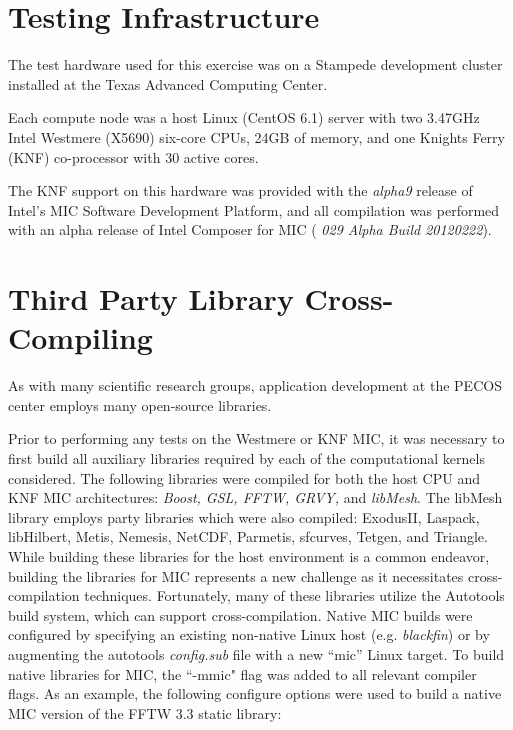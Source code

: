\section{Testing Infrastructure}
\label{sec:hardware}

The test hardware used for this exercise was
on a Stampede development cluster installed at the Texas Advanced
Computing Center.

Each compute node was a host Linux (CentOS 6.1)
server with two 3.47GHz Intel Westmere (X5690) six-core CPUs, 24GB of
memory, and one Knights Ferry (KNF) co-processor with 30 active
cores.

The KNF support on this hardware
was provided with the {\em alpha9} release of Intel's MIC Software
Development Platform, and all compilation was performed with an alpha
release of Intel Composer for MIC ({\em 
  029 Alpha Build 20120222}).

\section{Third Party Library Cross-Compiling} \label{sec:cross_compile}

As with many scientific research groups, application development at
the PECOS center employs many open-source libraries.

Prior to
performing any tests on the Westmere or KNF MIC, it was necessary to
first build all auxiliary libraries required by each of the
computational kernels considered.
The following libraries were
compiled for both the host CPU and KNF MIC architectures: {\em Boost,
GSL, FFTW\cite{FFTW05}, GRVY,} and
{\em libMesh}. The libMesh library employs  party libraries which
were also compiled: 
ExodusII, Laspack, libHilbert, Metis, Nemesis, NetCDF,
Parmetis, sfcurves, Tetgen, and Triangle.
%
While building these libraries for the host environment is
a common endeavor, building the libraries for MIC
represents a new challenge as it necessitates cross-compilation
techniques.
Fortunately, many of these libraries utilize the
Autotools build system, which can support cross-compilation.
Native MIC builds were configured by
specifying an existing non-native Linux host
(e.g. {\em blackfin}) or by augmenting the autotools {\em config.sub}
file with a new ``mic'' Linux target.
To build native libraries for MIC, the ``-mmic"
flag was added to all relevant compiler flags.
As an example, the following configure options were used to build a
native MIC version of the FFTW 3.3 static library:

